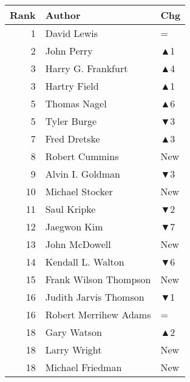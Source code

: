 \documentclass[
  10pt,
  letterpaper,
  DIV=11,
  numbers=noendperiod,
  twoside]{scrartcl}
\begin{document}
\begin{table}
\begin{minipage}{0.20\linewidth}
{\begin{tabular}{rll}
\toprule
Rank & Author & Chg\\
\midrule
1 & David Lewis & =\\
2 & John Perry & \textcolor[RGB]{34,178,34}{▲1}\\
3 & Harry G. Frankfurt & \textcolor[RGB]{34,178,34}{▲4}\\
3 & Hartry Field & \textcolor[RGB]{34,178,34}{▲1}\\
5 & Thomas Nagel & \textcolor[RGB]{34,178,34}{▲6}\\
5 & Tyler Burge & \textcolor[RGB]{178,34,34}{▼3}\\
7 & Fred Dretske & \textcolor[RGB]{34,178,34}{▲3}\\
8 & Robert Cummins & \textcolor[RGB]{34,178,34}{New}\\
9 & Alvin I. Goldman & \textcolor[RGB]{178,34,34}{▼3}\\
10 & Michael Stocker & \textcolor[RGB]{34,178,34}{New}\\
11 & Saul Kripke & \textcolor[RGB]{178,34,34}{▼2}\\
12 & Jaegwon Kim & \textcolor[RGB]{178,34,34}{▼7}\\
13 & John McDowell & \textcolor[RGB]{34,178,34}{New}\\
14 & Kendall L. Walton & \textcolor[RGB]{178,34,34}{▼6}\\
15 & Frank Wilson Thompson & \textcolor[RGB]{34,178,34}{New}\\
16 & Judith Jarvis Thomson & \textcolor[RGB]{178,34,34}{▼1}\\
16 & Robert Merrihew Adams & =\\
18 & Gary Watson & \textcolor[RGB]{34,178,34}{▲2}\\
18 & Larry Wright & \textcolor[RGB]{34,178,34}{New}\\
18 & Michael Friedman & \textcolor[RGB]{34,178,34}{New}\\
\bottomrule
\end{tabular}

}

\end{minipage}%
%
\begin{minipage}{0.20\linewidth}


\centering{

}
\end{minipage}
\end{table}
\end{document}
